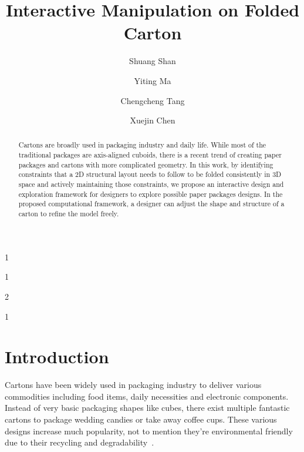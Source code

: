 \documentclass[submission]{gmp2018}
\begin{document}
%
%
\title{Interactive Manipulation on Folded Carton}

%
%
\SubNumber{{\color{red}{XXX}}}

%
%
\author{Shuang Shan}{1}
\author{Yiting Ma}{1}
\author{Chengcheng Tang}{2}
\author{Xuejin Chen}{1}

%
%

%
%


\maketitle

\begin{abstract}
Cartons are broadly used in packaging industry and daily life. While most of the traditional packages are axis-aligned cuboids, there is a recent trend of creating paper packages and cartons with more complicated geometry. In this work, by identifying constraints that a 2D structural layout needs to follow to be folded consistently in 3D space and actively maintaining those constraints, we propose an interactive design and exploration framework for designers to explore possible paper packages designs. In the proposed computational framework, a designer can adjust the shape and structure of a carton to refine the model freely.
\end{abstract}


\section{Introduction}
Cartons have been widely used in packaging industry to deliver various commodities including food items, daily necessities and electronic components. Instead of very basic packaging shapes like cubes, there exist multiple fantastic cartons to package wedding candies or take away coffee cups. These various designs increase much popularity, not to mention they're environmental friendly due to their recycling and degradability~\cite{Mullineux:2010:CSC:1739328.1739673}.
\end{document}
